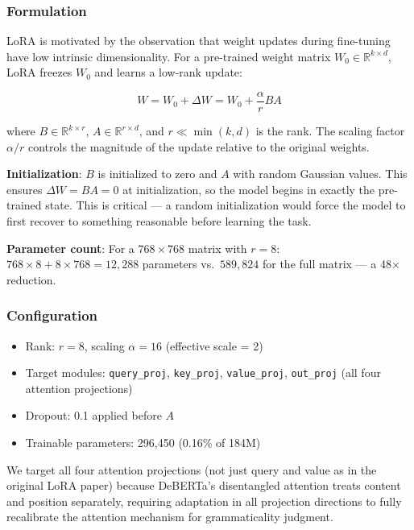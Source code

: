 \documentclass[12pt,a4paper]{article}
\theoremstyle{definition}
\begin{document}
\subsubsection{Formulation}

LoRA \cite{hu2022lora} is motivated by the observation that weight updates during fine-tuning have low intrinsic dimensionality. For a pre-trained weight matrix $W_0 \in \mathbb{R}^{k \times d}$, LoRA freezes $W_0$ and learns a low-rank update:

\begin{equation}
W = W_0 + \Delta W = W_0 + \frac{\alpha}{r} BA
\end{equation}

where $B \in \mathbb{R}^{k \times r}$, $A \in \mathbb{R}^{r \times d}$, and $r \ll \min(k, d)$ is the rank. The scaling factor $\alpha/r$ controls the magnitude of the update relative to the original weights.

\textbf{Initialization}: $B$ is initialized to zero and $A$ with random Gaussian values. This ensures $\Delta W = BA = 0$ at initialization, so the model begins in exactly the pre-trained state. This is critical — a random initialization would force the model to first recover to something reasonable before learning the task.

\textbf{Parameter count}: For a $768 \times 768$ matrix with $r=8$: $768 \times 8 + 8 \times 768 = 12{,}288$ parameters vs.\ $589{,}824$ for the full matrix — a 48× reduction.

\subsubsection{Configuration}

\begin{itemize}
    \item Rank: $r = 8$, scaling $\alpha = 16$ (effective scale = 2)
    \item Target modules: \texttt{query\_proj}, \texttt{key\_proj}, \texttt{value\_proj}, \texttt{out\_proj} (all four attention projections)
    \item Dropout: 0.1 applied before $A$
    \item Trainable parameters: 296,450 (0.16\% of 184M)
\end{itemize}

We target all four attention projections (not just query and value as in the original LoRA paper) because DeBERTa's disentangled attention treats content and position separately, requiring adaptation in all projection directions to fully recalibrate the attention mechanism for grammaticality judgment.
\end{document}
